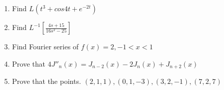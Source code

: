 \documentclass[17pt]{extarticle}
\begin{document}
\begin{enumerate}
    \item Find $ L(t^3 + cos 4t + e^{-2t} ) $
    \item Find $ L^{-1} \left[ \frac{4s+15}{16s^2-25} \right] $
    \item Find Fourier series of $ f(x) = 2, -1<x<1 $
    \item Prove that $ 4J''_n(x) =  J_{n-2}(x) - 2J_n(x) + J_{n+2}(x)  $
    \item Prove that the points. $(2,1,1), (0,1,-3), (3,2,-1), (7,2,7)   $
\end{enumerate}
\end{document}
